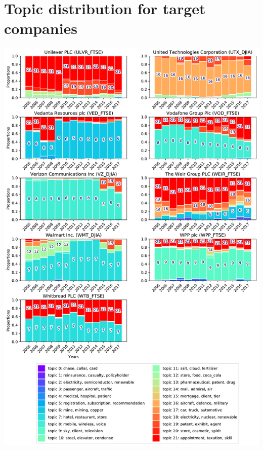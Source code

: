 \documentclass[12pt,journal,letterpaper,oneside,onecolumn]{IEEEtran}
\begin{document}
\section{Topic distribution for target companies}
\begin{center}
\includegraphics[width=0.85\linewidth]{images/companies_on_page_7.pdf}
\end{center}
\end{document}
